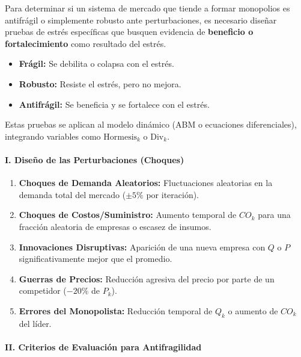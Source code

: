 \documentclass[a4paper,12pt]{article}
\begin{document}
Para determinar si un sistema de mercado que tiende a formar monopolios es antifrágil o simplemente robusto ante perturbaciones, es necesario diseñar pruebas de estrés específicas que busquen evidencia de \textbf{beneficio o fortalecimiento} como resultado del estrés.

\begin{itemize}
    \item \textbf{Frágil:} Se debilita o colapsa con el estrés.
    \item \textbf{Robusto:} Resiste el estrés, pero no mejora.
    \item \textbf{Antifrágil:} Se beneficia y se fortalece con el estrés.
\end{itemize}

Estas pruebas se aplican al modelo dinámico (ABM o ecuaciones diferenciales), integrando variables como $\text{Hormesis}_k$ o $\text{Div}_k$.

\paragraph{I. Diseño de las Perturbaciones (Choques)}

\begin{enumerate}
    \item \textbf{Choques de Demanda Aleatorios:} Fluctuaciones aleatorias en la demanda total del mercado ($\pm5\%$ por iteración).
    
    \item \textbf{Choques de Costos/Suministro:} Aumento temporal de $CO_k$ para una fracción aleatoria de empresas o escasez de insumos.
    
    \item \textbf{Innovaciones Disruptivas:} Aparición de una nueva empresa con $Q$ o $P$ significativamente mejor que el promedio.
    
    \item \textbf{Guerras de Precios:} Reducción agresiva del precio por parte de un competidor ($-20\%$ de $P_k$).
    
    \item \textbf{Errores del Monopolista:} Reducción temporal de $Q_k$ o aumento de $CO_k$ del líder.
\end{enumerate}

\paragraph{II. Criterios de Evaluación para Antifragilidad}
\end{document}
